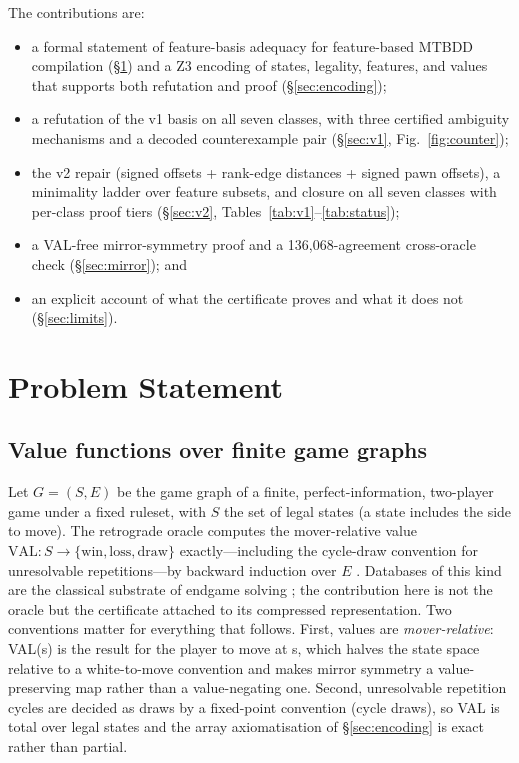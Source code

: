 \documentclass[conference]{IEEEtran}
\begin{document}
The contributions are:
\begin{itemize}
\item a formal statement of feature-basis adequacy for feature-based
MTBDD compilation (\S\ref{sec:problem}) and a Z3 encoding of states,
legality, features, and values that supports both refutation and proof
(\S\ref{sec:encoding});
\item a refutation of the v1 basis on all seven classes, with three
certified ambiguity mechanisms and a decoded counterexample pair
(\S\ref{sec:v1}, Fig.~\ref{fig:counter});
\item the v2 repair (signed offsets + rank-edge distances + signed pawn
offsets), a minimality ladder over feature subsets, and closure on all
seven classes with per-class proof tiers (\S\ref{sec:v2},
Tables~\ref{tab:v1}--\ref{tab:status});
\item a VAL-free mirror-symmetry proof and a 136{,}068-agreement
cross-oracle check (\S\ref{sec:mirror}); and
\item an explicit account of what the certificate proves and what it does
not (\S\ref{sec:limits}).
\end{itemize}

\section{Problem Statement}
\label{sec:problem}

\subsection{Value functions over finite game graphs}
Let $G=(S,E)$ be the game graph of a finite, perfect-information,
two-player game under a fixed ruleset, with $S$ the set of legal
states (a state includes the side to move). The retrograde oracle computes
the mover-relative value $\mathrm{VAL}: S \to \{\mathrm{win}, \mathrm{loss},
\mathrm{draw}\}$ exactly---including the cycle-draw convention for
unresolvable repetitions---by backward induction over $E$
\cite{thompson1986,allis1994}. Databases of this kind are the classical
substrate of endgame solving \cite{nalimov2000,schaeffer2007,vanherik2002};
the contribution here is not the oracle but the certificate attached to its
compressed representation. Two conventions matter for everything that
follows. First, values are \emph{mover-relative}: VAL(s) is the result for
the player to move at s, which halves the state space relative to a
white-to-move convention and makes mirror symmetry a value-preserving map
rather than a value-negating one. Second, unresolvable repetition cycles
are decided as draws by a fixed-point convention (cycle draws), so VAL is
total over legal states and the array axiomatisation of
\S\ref{sec:encoding} is exact rather than partial.
\end{document}
